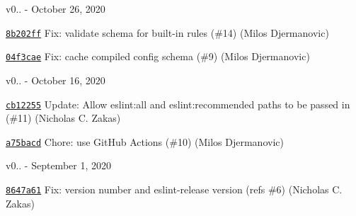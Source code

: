 v0.. -\/ October 26, 2020


\begin{DoxyItemize}
\item \href{https://github.com/eslint/eslintrc/commit/8b202ff866a39efdaad6394fde9f88372afbfca8}{\texttt{ {\ttfamily 8b202ff}}} Fix\+: validate schema for built-\/in rules (\#14) (Milos Djermanovic)
\item \href{https://github.com/eslint/eslintrc/commit/04f3cae17fe07b2fd0b74fd3e88482b3094e75e3}{\texttt{ {\ttfamily 04f3cae}}} Fix\+: cache compiled config schema (\#9) (Milos Djermanovic)
\end{DoxyItemize}

v0.. -\/ October 16, 2020


\begin{DoxyItemize}
\item \href{https://github.com/eslint/eslintrc/commit/cb12255b85390e932e1942e479c2c97310149390}{\texttt{ {\ttfamily cb12255}}} Update\+: Allow eslint\+:all and eslint\+:recommended paths to be passed in (\#11) (Nicholas C. Zakas)
\item \href{https://github.com/eslint/eslintrc/commit/a75bacd9a743a7bbcdb8c59e5d4f9de3dc8b0f20}{\texttt{ {\ttfamily a75bacd}}} Chore\+: use Git\+Hub Actions (\#10) (Milos Djermanovic)
\end{DoxyItemize}

v0.. -\/ September 1, 2020


\begin{DoxyItemize}
\item \href{https://github.com/eslint/eslintrc/commit/8647a61991fe121f923d33e96232475209b78210}{\texttt{ {\ttfamily 8647a61}}} Fix\+: version number and eslint-\/release version (refs \#6) (Nicholas C. Zakas) 
\end{DoxyItemize}